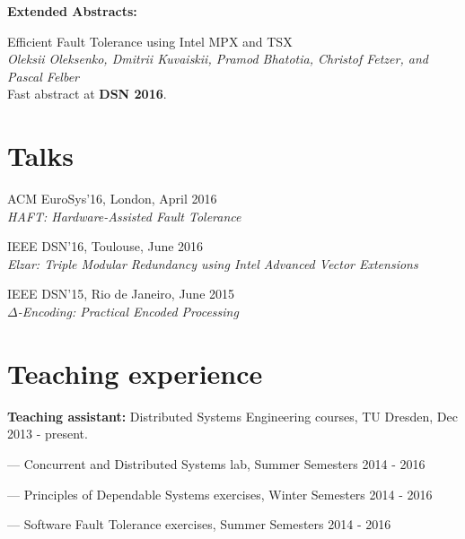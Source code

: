 \documentclass[letterpaper]{article}
\renewenvironment{itemize}{
  \begin{list}{}{
    \setlength{\leftmargin}{1.5em}
  }
}{
  \end{list}
}
\begin{document}
\clearpage

{\bf Extended Abstracts:}

\begin{itemize}

\item{Efficient Fault Tolerance using Intel MPX and TSX}\\
{\em Oleksii Oleksenko, {Dmitrii Kuvaiskii}, Pramod Bhatotia, Christof Fetzer, and Pascal Felber}\\
Fast abstract at {\bf DSN 2016}.


\end{itemize}


\section*{Talks}
\begin{itemize}
\item ACM EuroSys'16, London, April 2016\\
	{\em  HAFT: Hardware-Assisted Fault Tolerance}
\item IEEE DSN'16, Toulouse, June 2016\\
	{\em  Elzar: Triple Modular Redundancy using Intel Advanced Vector Extensions}
\item IEEE DSN'15, Rio de Janeiro, June 2015\\
{\em  $\Delta$-Encoding: Practical Encoded Processing}
\end{itemize}


\section*{Teaching experience}

\begin{itemize}
\item {\bf Teaching assistant:} Distributed Systems Engineering courses, TU Dresden, Dec 2013 - present.
\begin{itemize}
	\item --- Concurrent and Distributed Systems lab, Summer Semesters 2014 - 2016 
	\item --- Principles of Dependable Systems exercises, Winter Semesters 2014 - 2016
	\item --- Software Fault Tolerance exercises, Summer Semesters 2014 - 2016
\end{itemize}
\end{itemize}
\end{document}
